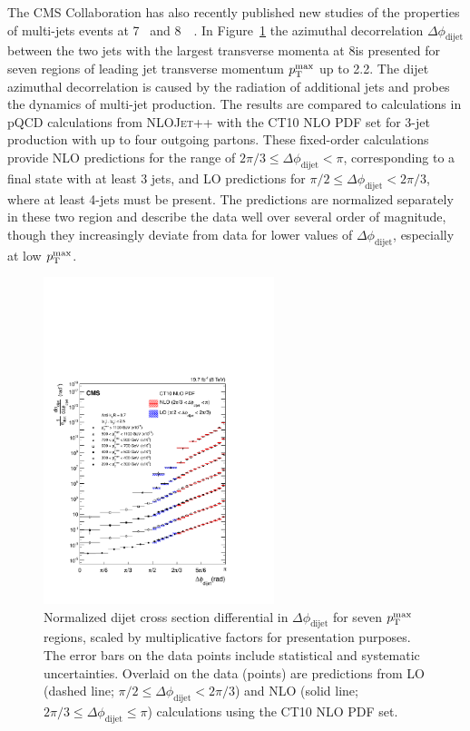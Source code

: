\documentclass{PoS}
\providecommand{\NLOJETPP} {{\textsc{NLOJet++}}\xspace}
\def\as{\ensuremath{\alpha_\mathrm{S}}\xspace}
\providecommand{\dphi}{\ensuremath{\Delta\phi_\text{dijet}}\xspace}
\providecommand{\ptmax}{\ensuremath{\pt^{\text{max}}}\xspace}
\begin{document}
The CMS Collaboration has also recently published new studies of the properties of multi-jets events at 7\TeV~\cite{Khachatryan:2016udy, Khachatryan:2015xwa} and
8~\TeV~\cite{Khachatryan:2016hkr}. In Figure~\ref{fig:dijet} the azimuthal decorrelation $\dphi$ between the two jets with the largest transverse momenta at
8\TeV is presented for seven regions of leading jet transverse momentum \ptmax up to 2.2\TeV. The dijet azimuthal decorrelation is caused by
the radiation of additional jets and probes the dynamics of multi-jet production. The results are compared to calculations in
pQCD calculations from \NLOJETPP with the CT10 NLO PDF set for 3-jet production with up to four outgoing partons.
These fixed-order calculations provide NLO predictions for the range of
$2\pi/3 \leq \dphi < \pi$, corresponding to a final state with at least 3 jets, and LO predictions for $\pi/2 \leq \dphi <
2\pi/3$, where at least 4-jets must be present. The predictions are normalized separately in these two region and
describe the data well over several order of magnitude, though they increasingly deviate from data for lower values of
\dphi, especially at low \ptmax. 

\begin{figure}[hbtp]
  \centering
  \includegraphics[width=0.6\textwidth]{Figure7a.pdf}
  \caption{Normalized dijet cross section differential in \dphi for
    seven \ptmax regions, scaled by multiplicative factors for
    presentation purposes.  The error bars on the data points include
    statistical and systematic uncertainties. Overlaid on the data
    (points) are predictions from LO (dashed line; $\pi/2 \leq
    \dphi < 2\pi/3$) and NLO (solid line; $2\pi/3 \leq \dphi \leq
    \pi$) calculations using the CT10 NLO PDF set. 
}
  \label{fig:dijet}
\end{figure}
\end{document}
